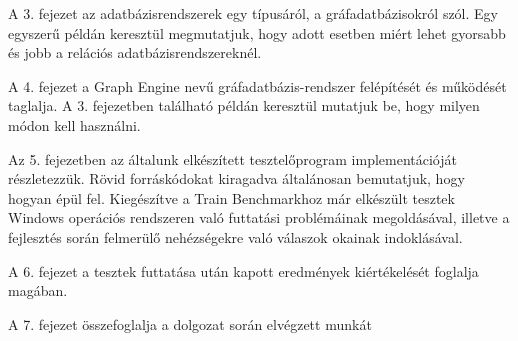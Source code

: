 A 3. fejezet az adatbázisrendszerek egy típusáról, a gráfadatbázisokról szól. Egy egyszerű példán keresztül megmutatjuk, hogy adott esetben miért lehet gyorsabb és jobb a relációs adatbázisrendszereknél.

A 4. fejezet a Graph Engine nevű gráfadatbázis-rendszer felépítését és működését taglalja. A 3. fejezetben található példán keresztül mutatjuk be, hogy milyen módon kell használni.

Az 5. fejezetben az általunk elkészített tesztelőprogram implementációját részletezzük. Rövid forráskódokat kiragadva általánosan bemutatjuk, hogy hogyan épül fel. Kiegészítve a Train Benchmarkhoz már elkészült tesztek Windows operációs rendszeren való futtatási problémáinak megoldásával, illetve a fejlesztés során felmerülő nehézségekre való válaszok okainak indoklásával.


A 6. fejezet a tesztek futtatása után kapott eredmények kiértékelését foglalja magában.

A 7. fejezet összefoglalja a dolgozat során elvégzett munkát